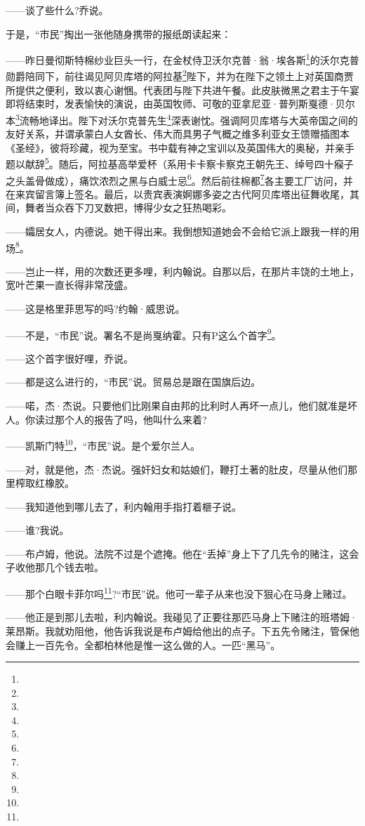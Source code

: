 \par ——谈了些什么?乔说。
\par 于是，“市民”掏出一张他随身携带的报纸朗读起来：
\par ——昨日曼彻斯特棉纱业巨头一行，在金杖侍卫沃尔克普·翁·埃各斯\footnote{}的沃尔克普勋爵陪同下，前往谒见阿贝库塔的阿拉基\footnote{}陛下，并为在陛下之领土上对英国商贾所提供之便利，致以衷心谢悃。代表团与陛下共进午餐。此皮肤微黑之君主于午宴即将结束时，发表愉快的演说，由英国牧师、可敬的亚拿尼亚·普列斯戛德·贝尔本\footnote{}流畅地译出。陛下对沃尔克普先生\footnote{}深表谢忱。强调阿贝库塔与大英帝国之间的友好关系，并谓承蒙白人女酋长、伟大而具男子气概之维多利亚女王馈赠插图本《圣经》，彼将珍藏，视为至宝。书中载有神之宝训以及英国伟大的奥秘，并亲手题以献辞\footnote{}。随后，阿拉基高举爱杯（系用卡卡察卡察克王朝先王、绰号四十瘊子之头盖骨做成），痛饮浓烈之黑与白威士忌\footnote{}。然后前往棉都\footnote{}各主要工厂访问，并在来宾留言簿上签名。最后，以贵宾表演婀娜多姿之古代阿贝库塔出征舞收尾，其间，舞者当众吞下刀叉数把，博得少女之狂热喝彩。
\par ——孀居女人，内德说。她干得出来。我倒想知道她会不会给它派上跟我一样的用场\footnote{}。
\par ——岂止一样，用的次数还更多哩，利内翰说。自那以后，在那片丰饶的土地上，宽叶芒果一直长得非常茂盛。
\par ——这是格里菲思写的吗?约翰·威思说。
\par ——不是，“市民”说。署名不是尚戛纳霍。只有P这么个首字\footnote{}。
\par ——这个首字很好哩，乔说。
\par ——都是这么进行的，“市民”说。贸易总是跟在国旗后边。
\par ——喏，杰·杰说。只要他们比刚果自由邦的比利时人再坏一点儿，他们就准是坏人。你读过那个人的报告了吗，他叫什么来着?
\par ——凯斯门特\footnote{}，“市民”说。是个爱尔兰人。
\par ——对，就是他，杰·杰说。强奸妇女和姑娘们，鞭打土著的肚皮，尽量从他们那里榨取红橡胶。
\par ——我知道他到哪儿去了，利内翰用手指打着榧子说。
\par ——谁?我说。
\par ——布卢姆，他说。法院不过是个遮掩。他在“丢掉”身上下了几先令的赌注，这会子收他那几个钱去啦。
\par ——那个白眼卡菲尔吗\footnote{}?“市民”说。他可一辈子从来也没下狠心在马身上赌过。
\par ——他正是到那儿去啦，利内翰说。我碰见了正要往那匹马身上下赌注的班塔姆·莱昂斯。我就劝阻他，他告诉我说是布卢姆给他出的点子。下五先令赌注，管保他会赚上一百先令。全都柏林他是惟一这么做的人。一匹“黑马”。

